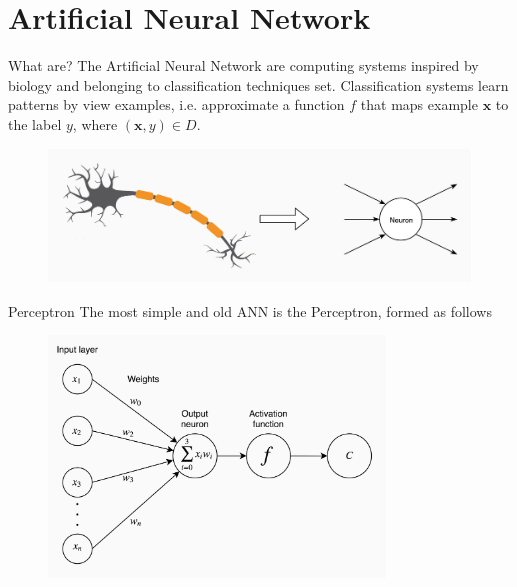 \documentclass[xcolor={usenames}]{beamer}
\begin{document}
  \section{Artificial Neural Network}
  \begin{frame}{What are?}
  	The Artificial Neural Network are computing systems inspired by biology and belonging to classification techniques set. Classification systems learn patterns by view examples, i.e. approximate a function $f$ that maps example \(\textbf{x}\) to the label $y$, where $(\textbf{x}, y) \in D$.
  	\begin{figure}
  		\includegraphics[width=\textwidth]{../figures/neuron.png}
  	\end{figure}
  \end{frame}
  \begin{frame}{Perceptron}
  	The most simple and old ANN \cite{ROSE:1958} is the Perceptron, formed as follows
  	\begin{figure}[t]
		\centering
		\includegraphics[width=0.8\textwidth]{../figures/perceptron.png}
	\end{figure}	
  \end{frame}
\end{document}
